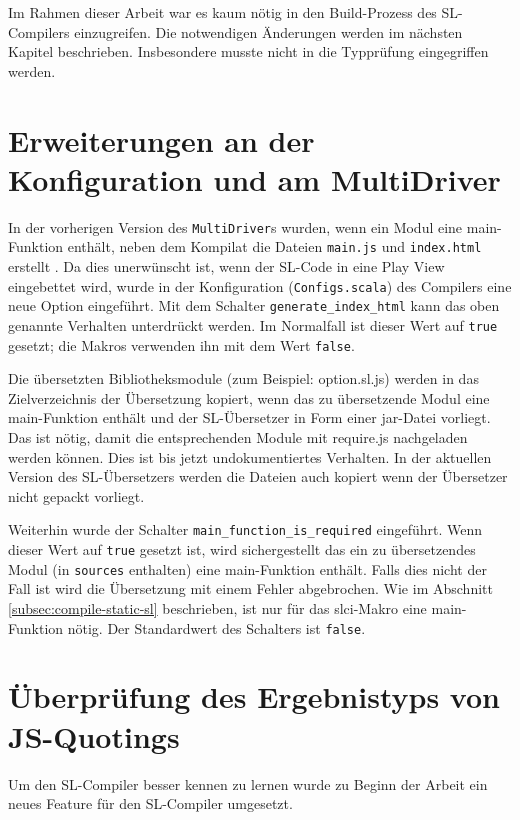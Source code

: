 \documentclass[12pt,bibtotoc]{scrreprt}
\begin{document}
Im Rahmen dieser Arbeit war es kaum nötig in den Build-Prozess\cite[S. 16-19]{Bisping2013} des SL-Compilers einzugreifen. Die notwendigen Änderungen werden im nächsten Kapitel beschrieben. Insbesondere musste nicht in die Typprüfung eingegriffen werden.

\section{Erweiterungen an der Konfiguration und am MultiDriver}

In der vorherigen Version des \lstinline!MultiDriver!s wurden, wenn ein Modul eine main-Funktion enthält, neben dem Kompilat die Dateien \lstinline!main.js! und \lstinline!index.html! erstellt \cite[S. 18-19]{Bisping2013}. Da dies unerwünscht ist, wenn der \ac{SL}-Code in eine Play View eingebettet wird, wurde in der Konfiguration (\lstinline!Configs.scala!) des Compilers eine neue Option eingeführt. Mit dem Schalter \lstinline!generate_index_html! kann das oben genannte Verhalten unterdrückt werden. Im Normalfall ist dieser Wert auf \lstinline!true! gesetzt; die Makros verwenden ihn mit dem Wert \lstinline!false!.

Die übersetzten Bibliotheksmodule (zum Beispiel: option.sl.js) werden in das Zielverzeichnis der Übersetzung kopiert, wenn das zu übersetzende Modul eine main-Funktion enthält und der SL-Übersetzer in Form einer jar-Datei vorliegt. Das ist nötig, damit die entsprechenden Module mit require.js nachgeladen werden können. Dies ist bis jetzt undokumentiertes Verhalten. In der aktuellen Version des SL-Übersetzers werden die Dateien auch kopiert wenn der Übersetzer nicht gepackt vorliegt.

Weiterhin wurde der Schalter \lstinline!main_function_is_required! eingeführt. Wenn dieser Wert auf \lstinline!true! gesetzt ist, wird sichergestellt das ein zu übersetzendes Modul (in \lstinline!sources! enthalten) eine main-Funktion enthält. Falls dies nicht der Fall ist wird die Übersetzung mit einem Fehler abgebrochen. Wie im Abschnitt \ref{subsec:compile-static-sl} beschrieben, ist nur für das slci-Makro eine main-Funktion nötig. Der Standardwert des Schalters ist \lstinline!false!.

\section{Überprüfung des Ergebnistyps von \ac{JS}-Quotings}

Um den SL-Compiler besser kennen zu lernen wurde zu Beginn der Arbeit ein neues Feature für den SL-Compiler umgesetzt.
\end{document}
